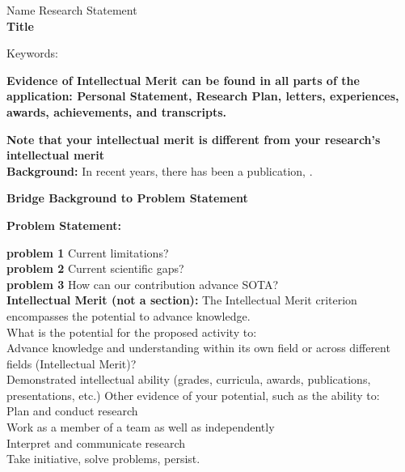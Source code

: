 \documentclass[12pt]{article}
\begin{document}
\begin{center}
Name
\hfill
Research Statement \\
\large{\bf Title} \\
\end{center}

\noindent
Keywords: \\
\newline

\noindent
\textbf{Evidence of Intellectual Merit can be found in all parts of the application:
Personal Statement, Research Plan, letters, experiences, awards, achievements, and transcripts.}

\noindent
\textbf{Note that your intellectual merit is different from your research’s intellectual merit}\\

\noindent
\textbf{Background:}
In recent years, there has been a publication, \cite{huang2018yolo}.

\noindent
\textbf{Bridge Background to Problem Statement}

\noindent
\textbf{Problem Statement:}

\noindent
\textbf{problem 1} Current limitations?\\

\noindent
\textbf{problem 2} Current scientific gaps?\\

\noindent
\textbf{problem 3} How can our contribution advance SOTA? \\

\noindent
\textbf{Intellectual Merit (not a section):} The Intellectual Merit criterion encompasses the potential to advance knowledge.\\
What is the potential for the proposed activity to:\\
Advance knowledge and understanding within its own field or across different fields (Intellectual Merit)?\\
Demonstrated intellectual ability (grades, curricula, awards, publications, presentations, etc.)
Other evidence of your potential, such as the ability to:\\
Plan and conduct research\\
Work as a member of a team as well as independently\\
Interpret and communicate research\\
Take initiative, solve problems, persist.\\
\end{document}
